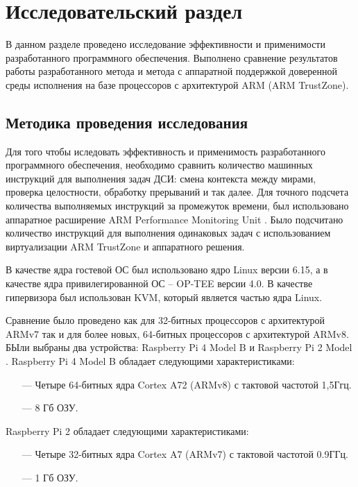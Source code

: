 \section{Исследовательский раздел}

В данном разделе проведено исследование эффективности и применимости разработанного программного обеспечения. Выполнено сравнение результатов работы разработанного метода и метода с аппаратной поддержкой доверенной среды исполнения на базе процессоров с архитектурой ARM (ARM TrustZone).

\subsection{Методика проведения исследования}

Для того чтобы иследовать эффективность и применимость разработанного программного обеспечения, необходимо сравнить количество машинных инструкций для выполнения задач ДСИ: смена контекста между мирами, проверка целостности, обработку прерываний и так далее. Для точного подсчета количества выполняемых инструкций за промежуток времени, был использовано аппаратное расширение ARM Performance Monitoring Unit \cite{arm-performance-monitor}. Было подсчитано количество инструкций для выполнения одинаковых задач с использованием виртуализации ARM TrustZone и аппаратного решения.

В качестве ядра гостевой ОС был использовано ядро Linux версии 6.15, а в качестве ядра привилегированной ОС -- OP-TEE версии 4.0. В качестве гипервизора был использован KVM, который является частью ядра Linux.

Сравнение было проведено как для 32-битных процессоров с архитектурой ARMv7 так и для более новых, 64-битных процессоров с архитектурой ARMv8. БЫли выбраны два устройства: Raspberry Pi 4 Model B \cite{rpi4-b} и Raspberry Pi 2 Model \cite{rpi2-b}. Raspberry Pi 4 Model B обладает следующими характеристиками:

\begin{itemize}
	\item [---] Четыре 64-битных ядра Cortex A72 (ARMv8) с тактовой частотой 1,5Ггц.
	\item [---] 8 Гб ОЗУ.
\end{itemize}

Raspberry Pi 2 обладает следующими характеристиками:

\begin{itemize}
	\item [---] Четыре 32-битных ядра Cortex A7 (ARMv7) с тактовой частотой 0.9ГГц.
	\item [---] 1 Гб ОЗУ.
\end{itemize}

